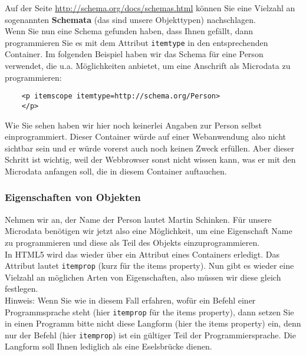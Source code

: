 Auf der Seite \url{http://schema.org/docs/schemas.html} können Sie eine Vielzahl an sogenannten \textbf{Schemata} (das sind unsere Objekttypen) nachschlagen.\\

Wenn Sie nun eine Schema gefunden haben, dass Ihnen gefällt, dann programmieren Sie es mit dem Attribut \verb|itemtype| in den entsprechenden Container. Im folgenden Beispiel haben wir das Schema für eine Person verwendet, die u.a. Möglichkeiten anbietet, um eine Anschrift als Microdata zu programmieren:

\begin{verbatim}
	<p itemscope itemtype=http://schema.org/Person>
	</p>
\end{verbatim}

Wie Sie sehen haben wir hier noch keinerlei Angaben zur Person selbst einprogrammiert. Dieser Container würde auf einer Webanwendung also nicht sichtbar sein und er würde vorerst auch noch keinen Zweck erfüllen. Aber dieser Schritt ist wichtig, weil der Webbrowser sonst nicht wissen kann, was er mit den Microdata anfangen soll, die in diesem Container auftauchen.

\subsubsection{Eigenschaften von Objekten}

Nehmen wir an, der Name der Person lautet \glqq{}Martin Schinken\grqq{}. Für unsere Microdata benötigen wir jetzt also eine Möglichkeit, um eine Eigenschaft \glqq{}Name\grqq{} zu programmieren und diese als Teil des Objekts einzuprogrammieren.\\

In HTML5 wird das wieder über ein Attribut eines Containers erledigt. Das Attribut lautet \verb|itemprop| (kurz für the items property). Nun gibt es wieder eine Vielzahl an möglichen Arten von Eigenschaften, also müssen wir diese gleich festlegen.\\

Hinweis: Wenn Sie wie in diesem Fall erfahren, wofür ein \glqq{}Befehl\grqq{} einer Programmsprache steht (hier \verb|itemprop| für the items property), dann setzen Sie in einen Programm bitte nicht diese Langform (hier \glqq{}the items property\grqq{}) ein, denn nur der \glqq{}Befehl\grqq{} (hier \verb|itemprop|) ist ein gültiger Teil der Programmiersprache. Die Langform soll Ihnen lediglich als eine Eselsbrücke dienen.\\

